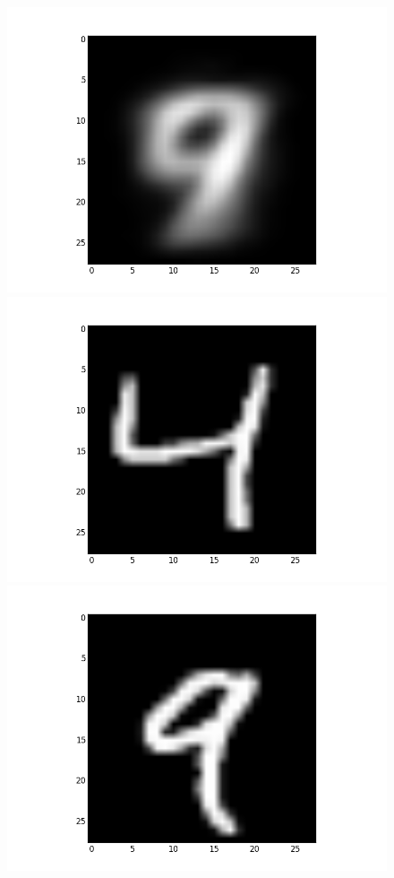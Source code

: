 \documentclass[submit]{harvardml}
\begin{document}
\begin{figure}[ht]
    \centering
    \includegraphics[scale=0.15]{K3-mean-0}
    \includegraphics[scale=0.15]{K3-representative-0-0}
    \includegraphics[scale=0.15]{K3-representative-0-1}

\end{figure}
\end{document}
